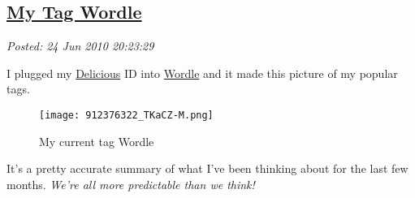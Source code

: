 %

\subsection*{\href{https://bakerjd99.wordpress.com/2010/06/24/my-tag-wordle/}{My Tag Wordle}}


\noindent\emph{Posted: 24 Jun 2010 20:23:29}
\vspace{6pt}

I plugged my \href{http://delicious.com/}{Delicious} ID into
\href{http://www.wordle.net/create}{Wordle} and it made this picture of
my popular tags.


\captionsetup[figure]{labelformat=empty}
\begin{figure}[htbp]
\centering
\texttt{[image: 912376322\_TKaCZ-M.png]}
\caption{My  current tag  Wordle}
\label{fig:640X0}
\end{figure}


It's a pretty accurate summary of what I've been thinking about for the
last few months. \emph{We're all more predictable than we think!}




%
